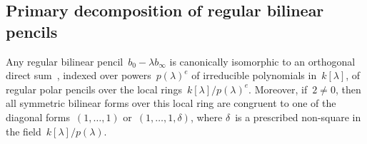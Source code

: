 \documentclass{lms}
\DeclareMathOperator\Ker{Ker}
\begin{document}
% 
% 
% 
% 
\subsection{Primary decomposition of regular bilinear pencils}
\label{ss:bil-regular}

Any regular bilinear pencil~$b_0 - λ b_∞$ is canonically isomorphic to
an orthogonal direct sum~\cite[Theorem 4.2]{inventiones1976waterhouse},
indexed over powers~$p(λ)^e$ of irreducible polynomials in~$k[λ]$,
of regular polar pencils over the local rings~$k[λ]/p(λ)^e$.
Moreover, if~$2 ≠ 0$, then all symmetric bilinear forms over this local ring
are congruent to one of the diagonal forms~$(1,…,1)$ or~$(1,…,1,δ)$,
where $δ$~is a prescribed non-square in the field~$k[λ]/p(λ)$.
\end{document}
